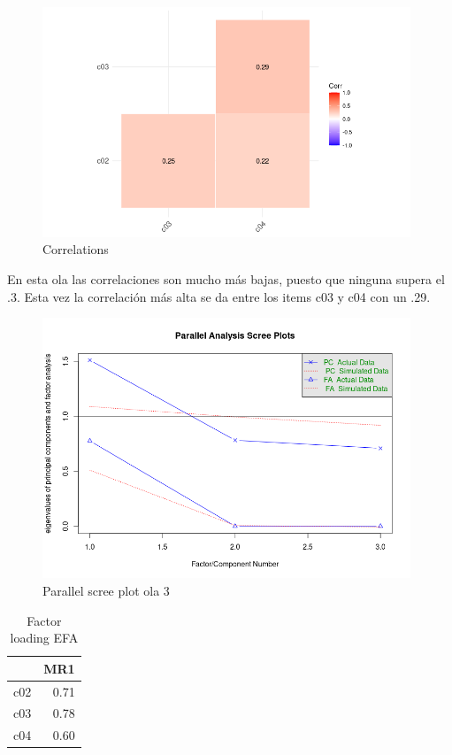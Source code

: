 \begin{figure}[H]
    \centering
    \includegraphics[width=11cm]{output/corrplot3.png}
    \caption{Correlations}
    \label{fig:corr3}
\end{figure}

En esta ola las correlaciones son mucho más bajas, puesto que ninguna supera el .3. Esta vez la correlación más alta se da entre los items  c03 y c04 con un .29. 

\begin{figure}[H]
    \centering
    \includegraphics[width=11cm]{output/scree_plots3.png}
    \caption{Parallel scree plot ola 3}
    \label{fig:scree3}
\end{figure}

\begin{table}[ht]
\centering
\caption{Factor loading EFA}
\begin{tabular}{rr}
  \hline
 & MR1 \\ 
  \hline
c02 & 0.71 \\ 
  c03 & 0.78 \\ 
  c04 & 0.60 \\ 
   \hline
\end{tabular}
\end{table}

